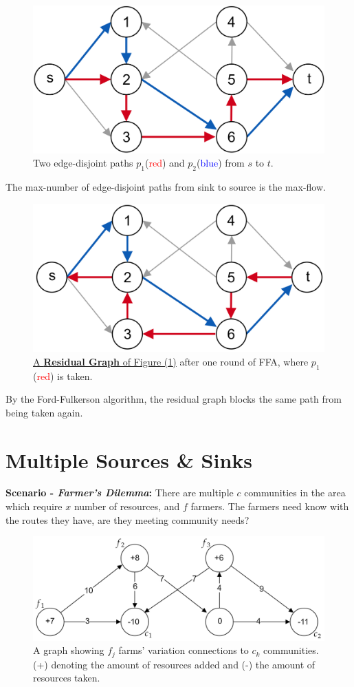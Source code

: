 \vspace{-.5em}
\begin{figure}[h]
    \centering
    \includegraphics[width=.4\textwidth]{Sections/net/dis.png}
    \caption{Two edge-disjoint paths $p_1$(\textcolor{red}{red}) and $p_2$(\textcolor{blue}{blue}) from $s$ to $t$.}
    \label{fig:dis}
\end{figure}

\vspace{-.5em}
\begin{theo}

    The max-number of edge-disjoint paths from sink to source is the max-flow.
\end{theo}

\vspace{-1em}
\begin{figure}[h]
    \centering
    \includegraphics[width=.4\textwidth]{Sections/net/resdis.png}
    \caption{\underline{A \textbf{Residual Graph} of Figure (\ref{fig:dis})} after one round of FFA, where $p_1$(\textcolor{red}{red}) is taken.}
\end{figure}

\noindent
By the Ford-Fulkerson algorithm, the residual graph blocks the same path from being taken again.
\newpage 
\section{Multiple Sources \& Sinks}
\textbf{Scenario - \textit{Farmer's Dilemma}:} There are multiple $c$ communities in the area
which require $x$ number of resources, and $f$ farmers. The farmers need know with the routes they have,
are they meeting community needs?

\begin{figure}[h]
    \centering
    \includegraphics[width=.6\textwidth]{Sections/net/farm.png}
    \caption{A graph showing $f_j$ farms' variation connections to $c_k$ communities. (+) denoting the amount of 
    resources added and (-) the amount of resources taken.}
    \label{fig:farm}
\end{figure}

